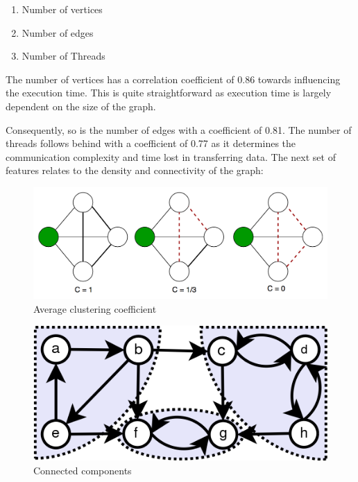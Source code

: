 \begin{enumerate}
  \item Number of vertices
  \item Number of edges
  \item Number of Threads
\end{enumerate}
The number of vertices has a correlation coefficient of 0.86 towards influencing the execution time. This is quite straightforward as execution time is largely dependent on the size of the graph.

Consequently, so is the number of edges with a coefficient of 0.81. The number of threads follows behind with a coefficient of 0.77 as it determines the communication complexity and time lost in transferring data. The next set of features relates to the density and connectivity of the graph: 

\begin{figure}
    \centering
    \includegraphics[width=1\columnwidth]{figures/features_avg_clustering.png}
    \caption{Average clustering coefficient}
    \label{Average clustering coefficient}
\end{figure}

\begin{figure}
    \centering
    \includegraphics[width=.5\columnwidth]{figures/features_scc.png}
    \caption{Connected components}
    \label{Connected components}
\end{figure}



